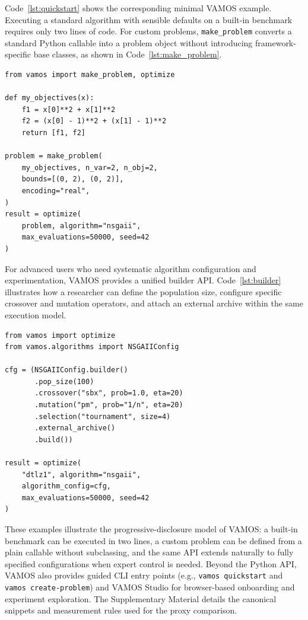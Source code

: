 \documentclass[final,5p,times,twocolumn]{elsarticle}
\newcommand{\VAMOS}{VAMOS}
\begin{document}
Code~\ref{lst:quickstart} shows the corresponding minimal \VAMOS{} example. Executing a standard algorithm with sensible defaults on a built-in benchmark requires only two lines of code. For custom problems, \texttt{make\_problem} converts a standard Python callable into a problem object without introducing framework-specific base classes, as shown in Code~\ref{lst:make_problem}.
\begin{lstlisting}[float=!ht,caption={Defining and optimizing a custom MOP in \VAMOS{}.},label={lst:make_problem}]
from vamos import make_problem, optimize

def my_objectives(x):
    f1 = x[0]**2 + x[1]**2
    f2 = (x[0] - 1)**2 + (x[1] - 1)**2
    return [f1, f2]

problem = make_problem(
    my_objectives, n_var=2, n_obj=2, 
    bounds=[(0, 2), (0, 2)],
    encoding="real",
)
result = optimize(
    problem, algorithm="nsgaii", 
    max_evaluations=50000, seed=42
)
\end{lstlisting}

For advanced users who need systematic algorithm configuration and experimentation, \VAMOS{} provides a unified builder API. Code~\ref{lst:builder} illustrates how a researcher can define the population size, configure specific crossover and mutation operators, and attach an external archive within the same execution model.

\begin{lstlisting}[float=tbp,caption={Using the builder API for fine-grained configuration in \VAMOS{}.},label={lst:builder}]
from vamos import optimize
from vamos.algorithms import NSGAIIConfig

cfg = (NSGAIIConfig.builder()
       .pop_size(100)
       .crossover("sbx", prob=1.0, eta=20)
       .mutation("pm", prob="1/n", eta=20)
       .selection("tournament", size=4)
       .external_archive()
       .build())

result = optimize(
    "dtlz1", algorithm="nsgaii", 
    algorithm_config=cfg, 
    max_evaluations=50000, seed=42
)
\end{lstlisting}

These examples illustrate the progressive-disclosure model of \VAMOS{}: a built-in benchmark can be executed in two lines, a custom problem can be defined from a plain callable without subclassing, and the same API extends naturally to fully specified configurations when expert control is needed. Beyond the Python API, \VAMOS{} also provides guided CLI entry points (e.g., \texttt{vamos quickstart} and \texttt{vamos create-problem}) and VAMOS Studio for browser-based onboarding and experiment exploration. The Supplementary Material details the canonical snippets and measurement rules used for the proxy comparison.
\end{document}
